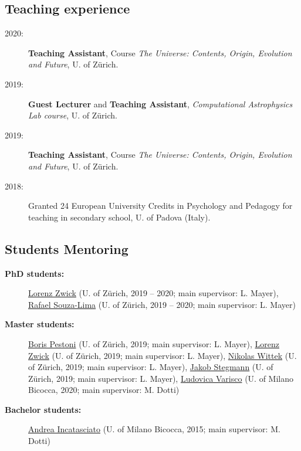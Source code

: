 \subsection*{Teaching experience}

\begin{description}

    \item[2020:] 
    \textbf{Teaching Assistant}, Course \textit{The Universe: Contents, Origin, Evolution and Future}, U. of Z\"urich.
    
    \item[2019:] \textbf{Guest Lecturer} and \textbf{Teaching Assistant},   \textit{Computational Astrophysics Lab course}, U. of Z\"urich. %

    \item[2019:] 
    \textbf{Teaching Assistant}, Course \textit{The Universe: Contents, Origin, Evolution and Future}, U. of Z\"urich.

    \item[2018:] Granted 24 European University Credits in Psychology and Pedagogy for teaching in secondary school, U. of Padova (Italy).
\end{description}

\subsection*{Students Mentoring}

\begin{description}

    
    \item[\bf PhD students:] \underline{Lorenz Zwick} (U. of Z\"urich, 2019 -- 2020; main supervisor: L. Mayer), \underline{Rafael Souza-Lima} (U. of Z\"urich, 2019 -- 2020; main supervisor: L. Mayer)

    \item[\bf Master students:] \underline{Boris Pestoni} (U. of Z\"urich, 2019; main supervisor: L. Mayer), \underline{Lorenz Zwick} (U. of Z\"urich, 2019; main supervisor: L. Mayer), \underline{Nikolas Wittek} (U. of Z\"urich, 2019; main supervisor: L. Mayer), \underline{Jakob Stegmann} (U. of Z\"urich, 2019; main supervisor: L. Mayer), \underline{Ludovica Varisco} (U. of Milano Bicocca, 2020; main supervisor: M. Dotti)
    
    \item[\bf Bachelor students:]  \underline{Andrea Incatasciato} (U. of Milano Bicocca, 2015; main supervisor: M. Dotti)


\end{description}

